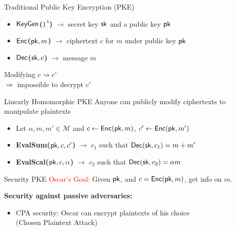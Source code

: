 \begin{frame}{Traditional Public Key Encryption (PKE)}
\begin{itemize}
\item \textcolor{mLightBrown}{\textbf{$\mathsf{KeyGen}$($1^\lambda$)}} $\rightarrow$ secret key $\mathsf{sk}$ and a public key $\mathsf{pk}$
\item \textcolor{mLightBrown}{\textbf{$\mathsf{Enc}$($\mathsf{pk},m$)}} $\rightarrow$ ciphertext $c$ for $m$ under public key $\mathsf{pk}$
\item \textcolor{mLightBrown}{\textbf{$\mathsf{Dec}$($\mathsf{sk},c$)}} $\rightarrow$ message $m$
\end{itemize}
Modifying $c \rightsquigarrow c'$ \\
\hspace{1cm} $\Rightarrow$ impossible to decrypt $c'$
\end{frame}

\begin{frame}{Linearly Homomorphic PKE}
Anyone can publicly modify ciphertexts to manipulate plaintexts
\begin{itemize}
\item Let $\alpha, m, m'\in \mathcal{M}$ and $c \gets \mathsf{Enc}(\mathsf{pk},m)$, $c'\gets \mathsf{Enc}(\mathsf{pk}, m')$
\item \textcolor{mLightBrown}{\textbf{EvalSum($\mathsf{pk}, c, c'$)}} $\rightarrow$ $c_1$ such that $\mathsf{Dec}(\mathsf{sk},c_1)=m+m'$
\item \textcolor{mLightBrown}{\textbf{EvalScal($\mathsf{pk}, c, \alpha$)}} $\rightarrow$ $c_2$ such that $\mathsf{Dec}(\mathsf{sk},c_2)=\alpha m$
\end{itemize}
\end{frame}

\begin{frame}{Security PKE}
\textcolor{red}{Oscar's Goal:} Given $\mathsf{pk}$, and $c=\mathsf{Enc}(\mathsf{pk},m)$, get info on $m$.

\textcolor{darkjunglegreen}{\textbf{Security against passive adversaries:}}
\begin{itemize}
\item CPA security: Oscar can encrypt plaintexts of his choice \\(Chosen Plaintext Attack)
\end{itemize}
\end{frame}

